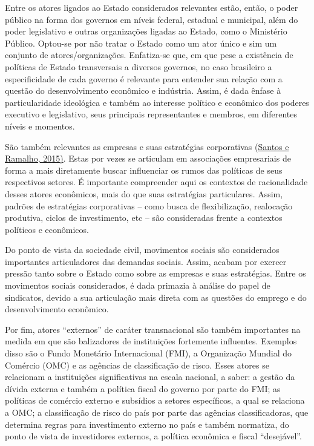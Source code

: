 Entre os atores ligados ao Estado considerados relevantes estão, então,
o poder público na forma dos governos em níveis federal, estadual e
municipal, além do poder legislativo e outras organizações ligadas ao
Estado, como o Ministério Público. Optou-se por não tratar o Estado como
um ator único e sim um conjunto de atores/organizações. Enfatiza-se que,
em que pese a existência de políticas de Estado transversais a diversos
governos, no caso brasileiro a especificidade de cada governo é
relevante para entender sua relação com a questão do desenvolvimento
econômico e indústria. Assim, é dada ênfase à particularidade ideológica
e também ao interesse político e econômico dos poderes executivo e
legislativo, seus principais representantes e membros, em diferentes
níveis e momentos.

São também relevantes as empresas e suas estratégias corporativas
\href{https://www.zotero.org/google-docs/?oIptwO}{(Santos e Ramalho,
2015)}. Estas por vezes se articulam em associações empresariais de
forma a mais diretamente buscar influenciar os rumos das políticas de
seus respectivos setores. É importante compreender aqui os contextos de
racionalidade desses atores econômicos, mais do que suas estratégias
particulares. Assim, padrões de estratégias corporativas -- como busca
de flexibilização, realocação produtiva, ciclos de investimento, etc --
são consideradas frente a contextos políticos e econômicos.

Do ponto de vista da sociedade civil, movimentos sociais são
considerados importantes articuladores das demandas sociais. Assim,
acabam por exercer pressão tanto sobre o Estado como sobre as empresas e
suas estratégias. Entre os movimentos sociais considerados, é dada
primazia à análise do papel de sindicatos, devido a sua articulação mais
direta com as questões do emprego e do desenvolvimento econômico.

Por fim, atores ``externos'' de caráter transnacional são também
importantes na medida em que são balizadores de instituições fortemente
influentes. Exemplos disso são o Fundo Monetário Internacional (FMI), a
Organização Mundial do Comércio (OMC) e as agências de classificação de
risco. Esses atores se relacionam a instituições significativas na
escala nacional, a saber: a gestão da dívida externa e também a política
fiscal do governo por parte do FMI; as políticas de comércio externo e
subsídios a setores específicos, a qual se relaciona a OMC; a
classificação de risco do país por parte das agências classificadoras,
que determina regras para investimento externo no país e também
normatiza, do ponto de vista de investidores externos, a política
econômica e fiscal ``desejável''.

